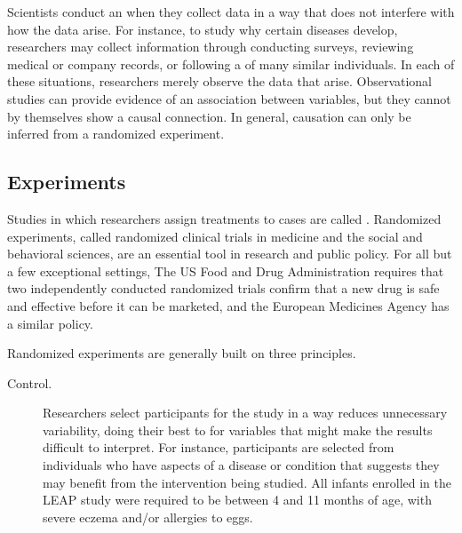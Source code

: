 \begin{doublespace}
Scientists conduct an  when they collect data in a way that does not interfere with how the data arise. For instance, to study why certain diseases develop, researchers may collect information through conducting surveys, reviewing medical or company records, or following a  of many similar individuals. In each of these situations, researchers merely observe the data that arise. Observational studies can provide evidence of an association between variables, but they cannot by themselves show a causal connection. In general, causation can only be inferred from a randomized experiment.

\subsection[Experiments]{Experiments}
\label{experiments}

Studies in which researchers assign treatments to cases are called . Randomized experiments, called randomized clinical trials in medicine and the social and behavioral sciences, are an essential tool in research and public policy.  For all but a few exceptional settings,  The US Food and Drug Administration requires that two independently conducted randomized trials confirm that a new drug is safe and effective before it can be marketed,  and the European Medicines Agency has a similar policy.  

Randomized experiments are generally built on three principles.


\begin{description}

	\item[Control.] Researchers select participants for the study in a way reduces unnecessary variability, doing their best to  for variables that might make the results difficult to interpret. For instance, participants are selected from individuals who have aspects of a disease or condition that suggests they may benefit from the intervention being studied. All infants enrolled in the LEAP study were required to be between 4 and 11 months of age, with severe eczema and/or allergies to eggs.


\end{description}
\end{doublespace}
